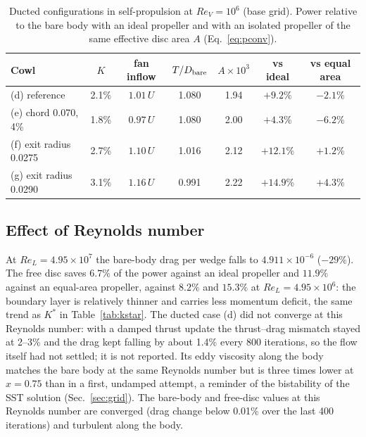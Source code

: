 \documentclass[11pt,a4paper]{article}
\newcommand{\ReV}{\mathit{Re}_V}
\newcommand{\ReL}{\mathit{Re}_L}
\begin{document}
\begin{table}[h]\centering
\caption{Ducted configurations in self-propulsion at $\ReV=10^6$ (base grid). Power relative
to the bare body with an ideal propeller and with an isolated propeller of the same effective
disc area $A$ (Eq.~\ref{eq:pconv}).}\label{tab:cowls}
\small\setlength{\tabcolsep}{4pt}
\begin{tabular}{lcccccc}
\toprule
Cowl & $K$ & fan inflow & $T/D_{\rm bare}$ & $A\times10^3$ & vs ideal & vs equal area\\
\midrule
(d) reference & 2.1\% & $1.01\,U$ & 1.080 & 1.94 & $+9.2\%$ & $-2.1\%$\\
(e) chord 0.070, 4\% & 1.8\% & $0.97\,U$ & 1.080 & 2.00 & $+4.3\%$ & $-6.2\%$\\
(f) exit radius 0.0275 & 2.7\% & $1.10\,U$ & 1.016 & 2.12 & $+12.1\%$ & $+1.2\%$\\
(g) exit radius 0.0290 & 3.1\% & $1.16\,U$ & 0.991 & 2.22 & $+14.9\%$ & $+4.3\%$\\
\bottomrule
\end{tabular}
\end{table}

\subsection{Effect of Reynolds number}\label{sec:re}
At $\ReL=4.95\times10^7$ the bare-body drag per wedge falls to $4.911\times10^{-6}$ ($-29\%$).
The free disc saves $6.7\%$ of the power against an ideal propeller and $11.9\%$ against an
equal-area propeller, against $8.2\%$ and $15.3\%$ at $\ReL=4.95\times10^6$: the boundary layer
is relatively thinner and carries less momentum deficit, the same trend as $K^*$ in
Table~\ref{tab:kstar}. The ducted case (d) did not converge at this Reynolds number: with a
damped thrust update the thrust--drag mismatch stayed at 2--3\% and the drag kept falling by about
1.4\% every 800 iterations, so the flow itself had not settled; it is not reported. Its eddy
viscosity along the body matches the bare body at the same Reynolds number but is three times
lower at $x=0.75$ than in a first, undamped attempt, a reminder of the bistability of the SST
solution (Sec.~\ref{sec:grid}). The bare-body and free-disc values at this Reynolds number are
converged (drag change below 0.01\% over the last 400 iterations) and turbulent along the body.
\end{document}
